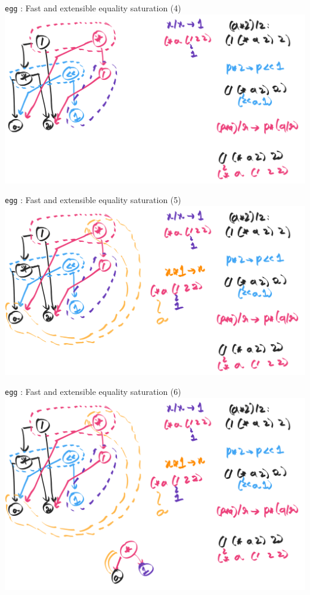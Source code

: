 \documentclass[8pt]{beamer}
\newcommand{\egg}{\texttt{egg} }
\begin{document}
\begin{frame}[fragile]{\egg: Fast and extensible equality saturation (4)}
\includegraphics[width=\textwidth]{./eg-1-4.png}
\end{frame}


\begin{frame}[fragile]{\egg: Fast and extensible equality saturation (5)}
\includegraphics[width=\textwidth]{./eg-1-5.png}
\end{frame}


\begin{frame}[fragile]{\egg: Fast and extensible equality saturation (6)}
\includegraphics[width=\textwidth]{./eg-1-6.png}
\end{frame}
\end{document}
